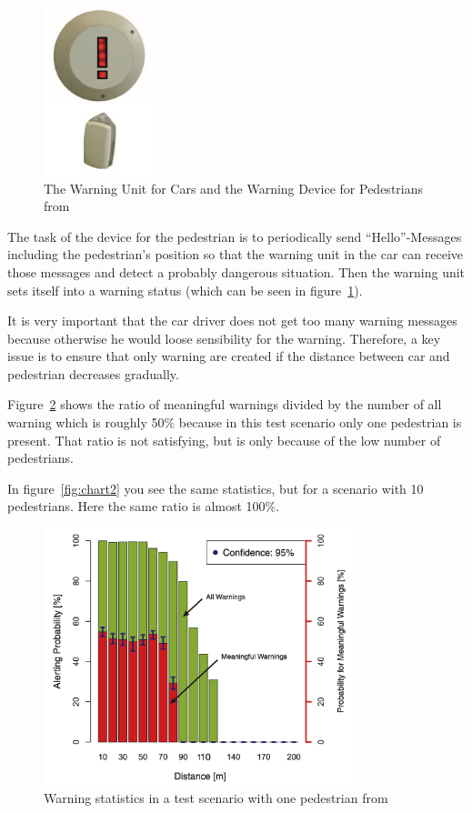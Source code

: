 \documentclass[]{ccs-thesis}
\begin{document}
\begin{figure}[h]
	\centering
	\includegraphics[width=0.3\textwidth]{figures/1_device}
	\caption{The Warning Unit for Cars and the Warning Device for Pedestrians from \cite{v2pprotection}}%
	\label{fig:device}%
\end{figure}

The task of the device for the pedestrian is to periodically send \enquote{Hello}-Messages including the pedestrian's position so that the warning unit in the car can receive those messages and detect a probably dangerous situation. Then the warning unit sets itself into a warning status (which can be seen in figure~\ref{fig:device}).

It is very important that the car driver does not get too many warning messages because otherwise he would loose sensibility for the warning. Therefore, a key issue is to ensure that only warning are created if the distance between car and pedestrian decreases gradually.

Figure~\ref{fig:chart1} shows the ratio of meaningful warnings divided by the number of all warning which is roughly 50\% because in this test scenario only one pedestrian is present. That ratio is not satisfying, but is only because of the low number of pedestrians.

In figure~\ref{fig:chart2} you see the same statistics, but for a scenario with 10 pedestrians. Here the same ratio is almost 100\%.


\begin{figure}[h]
	\centering
	\includegraphics[width=0.8\textwidth]{figures/2_chart}
	\caption{Warning statistics in a test scenario with one pedestrian from \cite{v2pprotection}}%
	\label{fig:chart1}%
\end{figure}
\end{document}
